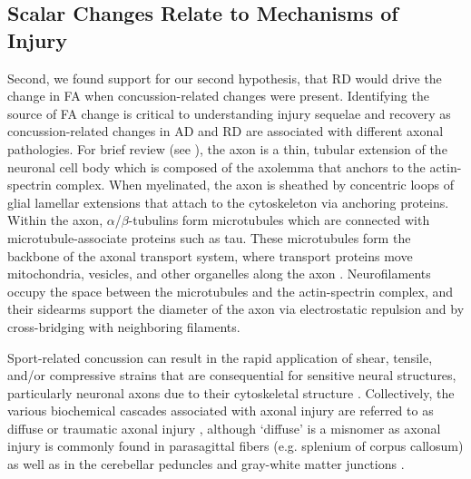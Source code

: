 \documentclass[12pt]{article}
\begin{document}
\subsection{Scalar Changes Relate to Mechanisms of Injury}
\label{ssec:disc-tract}
Second, we found support for our second hypothesis, that RD would drive the change in FA when concussion-related changes were present. Identifying the source of FA change is critical to understanding injury sequelae and recovery as concussion-related changes in AD and RD are associated with different axonal pathologies. For brief review (see \textcite{krieg2023IdentifyingPhenotypesDiffuse}), the axon is a thin, tubular extension of the neuronal cell body which is composed of the axolemma that anchors to the actin-spectrin complex. When myelinated, the axon is sheathed by concentric loops of glial lamellar extensions that attach to the cytoskeleton via anchoring proteins. Within the axon, $\alpha$/$\beta$-tubulins form microtubules which are connected with microtubule-associate proteins such as tau. These microtubules form the backbone of the axonal transport system, where transport proteins move mitochondria, vesicles, and other organelles along the axon \parencite{shin2020AxonalTransportDysfunction}. Neurofilaments occupy the space between the microtubules and the actin-spectrin complex, and their sidearms support the diameter of the axon via electrostatic repulsion and by cross-bridging with neighboring filaments.

Sport-related concussion can result in the rapid application of shear, tensile, and/or compressive strains that are consequential for sensitive neural structures, particularly neuronal axons due to their cytoskeletal structure \parencite{elsayed2008BiomechanicsTraumaticBrain,johnson2013AxonalPathologyTraumatic,bar-kochba2016StrainRatedependentNeuronal}. Collectively, the various biochemical cascades associated with axonal injury are referred to as diffuse or traumatic axonal injury \parencite{krieg2023IdentifyingPhenotypesDiffuse}, although `diffuse' is a misnomer as axonal injury is commonly found in parasagittal fibers (e.g. splenium of corpus callosum) as well as in the cerebellar peduncles and gray-white matter junctions \parencite{jang2020DiagnosticProblemsDiffuse,fork2005NeuropsychologicalSequelaeDiffuse,meythaler2001CurrentConceptsDiffuse,johnson2013AxonalPathologyTraumatic,lindsey2023DiffusionWeightedImagingMild}.
\end{document}
